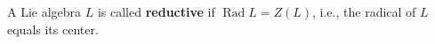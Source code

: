 A Lie algebra $L$ is called \textbf{reductive} if $\operatorname{Rad} L = Z(L)$, i.e., the radical of $L$ equals its center.
